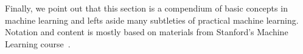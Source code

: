Finally, we point out that this section is a compendium of basic concepts in machine learning and lefts aside many subtleties of practical machine learning. Notation and content is mostly based on materials from Stanford's Machine Learning course~\cite{Ng2014}.
